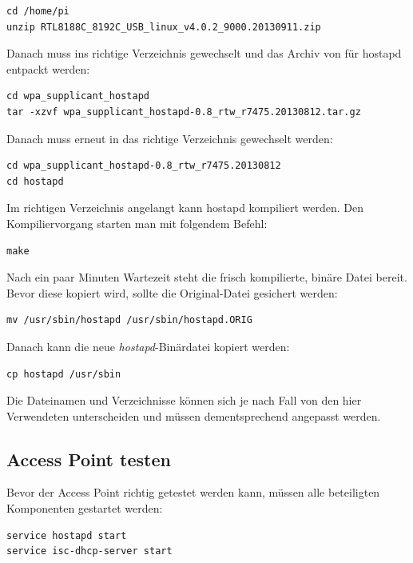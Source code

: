 \begin{lstlisting}
cd /home/pi
unzip RTL8188C_8192C_USB_linux_v4.0.2_9000.20130911.zip
\end{lstlisting}

Danach muss ins richtige Verzeichnis gewechselt und das Archiv von für hostapd entpackt werden:

\begin{lstlisting}
cd wpa_supplicant_hostapd
tar -xzvf wpa_supplicant_hostapd-0.8_rtw_r7475.20130812.tar.gz
\end{lstlisting}

Danach muss erneut in das richtige Verzeichnis gewechselt werden:

\begin{lstlisting}
cd wpa_supplicant_hostapd-0.8_rtw_r7475.20130812
cd hostapd
\end{lstlisting}

Im richtigen Verzeichnis angelangt kann hostapd kompiliert werden. Den Kompiliervorgang starten man mit folgendem Befehl:

\begin{lstlisting}
make
\end{lstlisting}

Nach ein paar Minuten Wartezeit steht die frisch kompilierte, binäre Datei bereit. Bevor diese kopiert wird, sollte die Original-Datei gesichert werden:

\begin{lstlisting}
mv /usr/sbin/hostapd /usr/sbin/hostapd.ORIG
\end{lstlisting}

Danach kann die neue \textit{hostapd}-Binärdatei kopiert werden:

\begin{lstlisting}
cp hostapd /usr/sbin	
\end{lstlisting}

Die Dateinamen und Verzeichnisse können sich je nach Fall von den hier Verwendeten unterscheiden und müssen dementsprechend angepasst werden.

\subsection{Access Point testen}
Bevor der Access Point richtig getestet werden kann, müssen alle beteiligten Komponenten gestartet werden:

\begin{lstlisting}
service hostapd start
service isc-dhcp-server start
\end{lstlisting}

